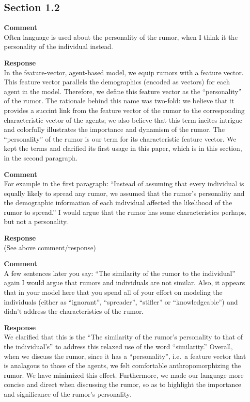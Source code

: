 \subsection{Section 1.2}
\setcounter{rev2-1.2}{1}

\textbf{Comment } \\
Often language is used about the personality of the rumor, when I think it the personality of the individual instead.

\textbf{Response } \\
In the feature-vector, agent-based model, we equip rumors with a feature vector.
This feature vector parallels the demographics (encoded as vectors) for each agent in the model.
Therefore, we define this feature vector as the ``personality'' of the rumor.
The rationale behind this name was two-fold: we believe that it provides a succint link from the feature vector of the rumor to the corresponding characteristic vector of the agents; we also believe that this term incites intrigue and colorfully illustrates the importance and dynamism of the rumor.
The ``personality'' of the rumor is our term for its characteristic feature vector.
We kept the terms and clarified its first usage in this paper, which is in this section, in the second paragraph.


\textbf{Comment } \\
For example in the first paragraph: ``Instead of assuming that every individual is equally likely to spread any rumor, we assumed that the rumor's personality and the demographic information of each individual affected the likelihood of the rumor to spread.''
I would argue that the rumor has some characteristics perhaps, but not a personality.

\textbf{Response } \\
(See above comment/response)

\textbf{Comment } \\
A few sentences later you say: ``The similarity of the rumor to the individual\textellipsis'' again I would argue that rumors and individuals are not similar.
Also, it appears that in your model here that you spend all of your effort on modeling the individuals (either as ``ignorant'', ``spreader'', ``stiﬂer'' or ``knowledgeable'') and didn't address the characteristics of the rumor.

\textbf{Response } \\
We clarified that this is the ``The similarity of the rumor's personality to that of the individual's'' to address this relaxed use of the word ``similarity.''
Overall, when we discuss the rumor, since it has a ``personality'', i.e.\ a feature vector that is analagous to those of the agents, we felt comfortable anthropomorphizing the rumor.
We have minimized this effect.
Furthermore, we made our language more concise and direct when discussing the rumor, so as to highlight the importance and significance of the rumor's personality.

